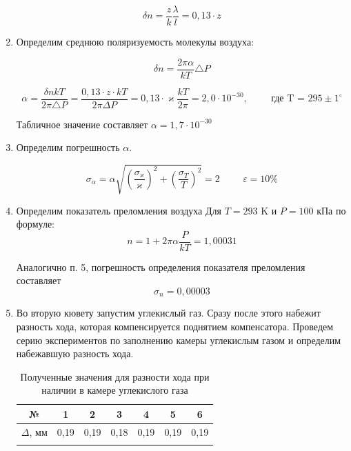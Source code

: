 \documentclass[a4paper, 12pt]{article}%
\begin{document}
\begin{enumerate}
		\begin{equation}
			\delta n = \frac{z}{k} \frac{\lambda}{l} = 0,13 \cdot  z
		\end{equation}

		
		\item Определим среднюю поляризуемость молекулы воздуха:
		
		\begin{equation}
			\delta n = \frac{2 \pi \alpha}{kT} \triangle P
		\end{equation}
		
		\begin{equation}
			\alpha = \frac{\delta n kT}{2 \pi \triangle P} = \frac{0,13 \cdot z \cdot kT}{2 \pi \Delta P}=0,13 \cdot \varkappa \frac{ kT}{2 \pi} = 2,0 \cdot 10^{-30}, \hspace{1cm} \text{где T = 295} \pm {1^\circ}
		\end{equation}
		
		Табличное значение составляет $ \alpha = 1,7 \cdot 10^{-30}$
		
		\item Определим погрешность $ \alpha$.
		
		\begin{equation}
			\sigma_{\alpha} = \alpha\sqrt{ (\frac{\sigma_{\varkappa}}{\varkappa})^2 + (\frac{\sigma_{T}}{T})^2 } = 2 \hspace{1cm} \varepsilon = 10\%
		\end{equation}
		
		\item Определим показатель преломления воздуха Для $T = 293$ K и $P = 100$ кПа по формуле:
		\begin{equation}
			n = 1 + 2\pi\alpha \frac{P}{kT} = 1,00031
		\end{equation}
		
		Аналогично п. 5, погрешность определения показателя преломления составляет 
		\begin{equation}
			\sigma_n = 0,00003 
		\end{equation}
	
	\item Во вторую кювету запустим углекислый газ. Сразу после этого набежит разность хода, которая компенсируется поднятием компенсатора. Проведем серию экспериментов по заполнению камеры углекислым газом и определим набежавшую разность хода.
	
	\begin{longtable}{|c|c|c|c|c|c|c|}
		\hline
		№ & 1 & 2 & 3 & 4 & 5 & 6 \\ \hline
		$\Delta $, мм & 0,19 & 0,19 & 0,18 & 0,19 & 0,19 & 0,19 \\ \hline
		\caption{Полученные значения для разности хода при наличии в камере углекислого газа}
	\end{longtable}


\end{enumerate}
\end{document}
